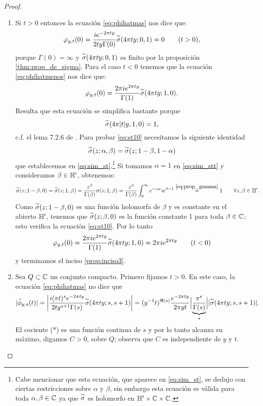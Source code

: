\documentclass[../../tesis_maestria]{subfiles}
\begin{document}
\begin{proof}
\begin{enumerate}[label=\emph{\roman*})]
\item Si $t>0$ entonces la ecuaci\'on \eqref{eq:phihatmas} nos dice que:
  \[
    \varphi_{y,t}(0)=\frac{ie^{-2\pi ty}}{2ty\Gamma(0)}\overset{\sim}{\sigma}(4\pi ty;0,1)=0\qquad(t>0),
  \]
  porque $\Gamma(0)=\infty$ y $\overset{\sim}{\sigma}(4\pi ty;0,1)$ es finito por la proposici\'on
  \ref{thm:prop_de_sigma}. Para el caso $t<0$ tenemos que la ecuaci\'on \eqref{eq:phihatmenos}
    nos dice que:
  \[
    \varphi_{y,t}(0)=\frac{2\pi ie^{2\pi ty}}{\Gamma(1)}\overset{\sim}{\sigma}(4\pi ty;1,0).
  \]
  Resulta que esta ecuaci\'on se simplifica bastante porque
  \begin{equation}\label{eq:st10}
    \overset{\sim}{\sigma}(4\pi|t|y,1,0)=1,
  \end{equation}
  c.f. el lema 7.2.6 de \cite{MiyakeMF}. Para probar \eqref{eq:st10} necesitamos la siguiente identidad
  \begin{equation}\label{eq:sim_stt}
    \overset{\sim}{\sigma}(z;\alpha,\beta)=\overset{\sim}{\sigma}(z;1-\beta,1-\alpha)
  \end{equation}
  que establecemos en \eqref{eq:sim_st}.\footnote{Cabe mencionar que esta ecuaci\'on, que aparece en
    \eqref{eq:sim_st}, se dedujo con ciertas restricciones sobre $\alpha$ y $\beta$, sin embargo esta
    ecuaci\'on es v\'alida para toda $\alpha,\beta\in\mathbb{C}$ ya que $\overset{\sim}{\sigma}$ es holomorfo en
    $\mathbb{H}'\times\mathbb{C}\times\mathbb{C}$.} Si tomamos $\alpha=1$ en \eqref{eq:sim_stt} y consideramos
  $\beta\in\mathbb{H}'$, obtenemos:
  \[
    \overset{\sim}{\sigma}(z;1-\beta,0)
    =\overset{\sim}{\sigma}(z;1,\beta)=\frac{z^{\beta}}{\Gamma(\beta)}\sigma(z;1,\beta)
    =\frac{z^{\beta}}{\Gamma(\beta)}\int_{0}^{\infty}e^{-zw}w^{\beta-1}
    \overset{\eqref{eq:prop_gamma}}{=}1 \qquad\forall z,\beta\in\mathbb{H}'.
  \]
  Como $\overset{\sim}{\sigma}(z;1-\beta,0)$ es una funci\'on holomorfa de $\beta$ y es constante en el abierto $\mathbb{H}'$,
  tenemos que $\overset{\sim}{\sigma}(z;\beta,0)$ es la funci\'on constante 1 para toda $\beta\in\mathbb{C}$; esto verifica
  la ecuaci\'on \eqref{eq:st10}. Por lo tanto
  \[
    \varphi_{y,t}(0)=\frac{2\pi ie^{2\pi ty}}{\Gamma(1)}\overset{\sim}{\sigma}(4\pi ty;1,0)=2\pi i e^{2\pi ty} \qquad(t<0)
  \]
  y terminamos el inciso \ref{prop:inciso3}.
\item Sea $Q\subset\mathbb{C}$ un conjunto compacto. Primero fijamos $t>0$. En este caso, la ecuaci\'on
  \eqref{eq:phihatmas} no dice que
  \[
    |\hat{\phi}_{y,s}(t)|
    =\left| \frac{i(\pi t)^se^{-2\pi ty}}{2ty^{s+1}\Gamma(s)}\overset{\sim}{\sigma}(4\pi ty;s,s+1) \right|
    =(y^{-1}t)^{\Re(s)}\frac{e^{-2\pi ty}}{2\pi yt}
    \Big|\underset{*}{\underbrace{\frac{\pi^s}{\Gamma(s)}}}\Big| |\overset{\sim}{\sigma}(4\pi ty;s,s+1)|.
  \]
  El cociente (*) es una funci\'on continua de $s$ y por lo tanto alcanza su m\'aximo, digamos $C>0$,
  sobre $Q$; observa que $C$ es independiente de $y$ y $t$.


\end{enumerate}
\end{proof}
\end{document}
